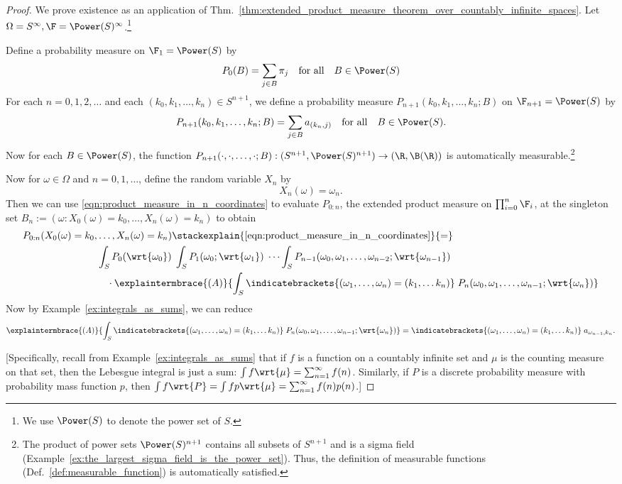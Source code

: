 \documentclass{article} %
\begin{document}
\begin{proof}
We prove existence as an application of Thm.~\ref{thm:extended_product_measure_theorem_over_countably_infinite_spaces}. Let $\Omega=S^\infty, \F = \Power(S)^\infty$.\footnote{We use $\Power(S)$ to denote the power set of $S$.} 

Define a probability measure on $\F_1 = \Power(S)$ by 
\[ P_0(B) = \sum_{j \in B} \pi_j \quad \text{for all} \quad B \in \Power(S) \]
For each $n=0,1,2,\hdots$ and each $(k_0, k_1, \hdots, k_n) \in S^{n+1}$, we define a probability measure $P_{n+1}(k_0, k_1, \hdots, k_n; B)$ on $\F_{n+1}=\Power(S)$ by 
\[ P_{n+1}(k_0, k_1, \hdots, k_n; B) = \sum_{j \in B} a_{(k_n, j)} \quad \text{for all} \quad B \in \Power(S).\]
Now for each $B \in \Power(S)$, the function $P_{n+1}(\cdot, \cdot, \hdots, \cdot; B): (S^{n+1}, \Power(S)^{n+1}) \to (\R, \B(\R))$ is automatically measurable.\footnote{The product of power sets $\Power(S)^{n+1}$ contains all subsets of $S^{n+1}$ and is a sigma field (Example~\ref{ex:the_largest_sigma_field_is_the_power_set}). Thus, the definition of measurable functions (Def.~\ref{def:measurable_function}) is automatically satisfied.}

Now for $\omega \in \Omega$ and $n=0,1, \hdots$, define the random variable $X_n$ by
%
\[ X_n(\omega) = \omega_n. \]
%
Then we can use \eqref{eqn:product_measure_in_n_coordinates}  to evaluate $P_{0:n}$, the extended product measure on $\prod_{i=0}^n \F_i$, at the singleton set $B_n := (\omega : X_0(\omega)=k_0, \hdots, X_n(\omega)=k_n)$ to obtain
%
\begin{align*}
P_{0:n}(X_0(\omega)=k_0, & \hdots, X_n(\omega)=k_n) \stackexplain{\eqref{eqn:product_measure_in_n_coordinates}}{=} \\
& \int_S P_0(\wrt{\omega_0}) \; \int_S P_1(\omega_0; \wrt{\omega_1})	\; \cdots \int_S P_{n-1}(\omega_0, \omega_1, \hdots, \omega_{n-2}; \wrt{\omega_{n-1}}) \\
& \quad \cdot \explaintermbrace{(A)}{\int_S \indicatebrackets{(\omega_1,\hdots, \omega_n) = (k_1,\hdots k_n)} \; P_n(\omega_0, \omega_1, \hdots, \omega_{n-1}; \wrt{\omega_{n}})}
\end{align*}
%
Now by Example~\ref{ex:integrals_as_sums}, we can reduce 
\[\explaintermbrace{(A)}{\int_S \indicatebrackets{(\omega_1,\hdots, \omega_n) = (k_1,\hdots k_n)} \; P_n(\omega_0, \omega_1, \hdots, \omega_{n-1}; \wrt{\omega_{n}})} = \indicatebrackets{(\omega_1,\hdots, \omega_n) = (k_1,\hdots k_n)} \; a_{\omega_{n-1}, k_n}. \]

{\scriptsize [Specifically, recall from Example~\ref{ex:integrals_as_sums} that if $f$ is a function on a countably infinite set and $\mu$ is the counting measure on that set, then the Lebesgue integral is just a sum: $\int f \wrt{\mu} = \sum_{n=1}^\infty f(n)$.  Similarly, if $P$ is a discrete probability measure with probability mass function $p$, then $\int f \wrt{P} = \int fp \wrt{\mu} = \sum_{n=1}^\infty f(n)p(n)$.]}


\end{proof}
\end{document}
